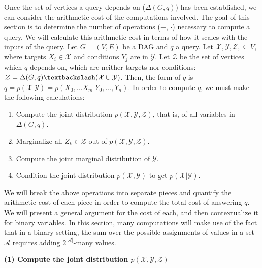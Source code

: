 \null \quad \quad Once the set of vertices a query depends on ($\Delta(G,q)$) has been established, we can consider the arithmetic cost of the computations involved. The goal of this section is to determine the number of operations (+, $\cdot$) necessary to compute a query. We will calculate this arithmetic cost in terms of how it scales with the inputs of the query. \newline
\null \quad \quad Let $G = (V,E)$ be a DAG and $q$ a query. Let $\mathcal{X}, \mathcal{Y}, \mathcal{Z}, \subseteq V$, where targets $X_{i} \in \mathcal{X}$ and conditions $Y_{j}$ are in $\mathcal{Y}$. Let $\mathcal{Z}$ be the set of vertices which $q$ depends on, which are neither targets nor conditions: $\mathcal{Z} = \Delta(G,q) \textbackslash (\mathcal{X} \cup \mathcal{Y})$. Then, the form of $q$ is $q = p(\mathcal{X}|\mathcal{Y}) = p(X_{0},...X_{m}|Y_{0},...,Y_{n})$. In order to compute $q$, we must make the following calculations:
\begin{enumerate}
\item Compute the joint distribution $p(\mathcal{X},\mathcal{Y},\mathcal{Z})$, that is, of all variables in $\Delta(G,q)$.
\item Marginalize all $Z_{k} \in \mathcal{Z}$ out of $p(\mathcal{X},\mathcal{Y},\mathcal{Z})$. 
\item Compute the joint marginal distribution of $\mathcal{Y}$.
\item Condition the joint distribution $p(\mathcal{X},\mathcal{Y})$ to get $p(\mathcal{X}|\mathcal{Y})$.
\end{enumerate}

We will break the above operations into separate pieces and quantify the arithmetic cost of each piece in order to compute the total cost of answering $q$. We will present a general argument for the cost of each, and then contextualize it for binary variables. In this section, many computations will make use of the fact that in a binary setting, the sum over the possible assignments of values in a set $\mathcal{A}$ requires adding $2^{|\mathcal{A}|}$-many values. \newline

\textbf{(1) Compute the joint distribution $p(\mathcal{X}, \mathcal{Y}, \mathcal{Z})$}
\vspace{-4mm}

